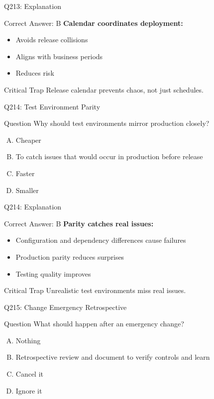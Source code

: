 \documentclass{beamer}
\begin{document}
	\begin{frame}{Q213: Explanation}
		\begin{block}{Correct Answer: B}
			\textbf{Calendar coordinates deployment:}
			\begin{itemize}
				\item Avoids release collisions
				\item Aligns with business periods
				\item Reduces risk
			\end{itemize}
		\end{block}
		\begin{alertblock}{Critical Trap}
			Release calendar prevents chaos, not just schedules.
		\end{alertblock}
	\end{frame}
	
	\begin{frame}{Q214: Test Environment Parity}
		\begin{block}{Question}
			Why should test environments mirror production closely?
		\end{block}
		\begin{enumerate}[(A)]
			\item Cheaper
			\item To catch issues that would occur in production before release
			\item Faster
			\item Smaller
		\end{enumerate}
	\end{frame}
	
	\begin{frame}{Q214: Explanation}
		\begin{block}{Correct Answer: B}
			\textbf{Parity catches real issues:}
			\begin{itemize}
				\item Configuration and dependency differences cause failures
				\item Production parity reduces surprises
				\item Testing quality improves
			\end{itemize}
		\end{block}
		\begin{alertblock}{Critical Trap}
			Unrealistic test environments miss real issues.
		\end{alertblock}
	\end{frame}
	
	\begin{frame}{Q215: Change Emergency Retrospective}
		\begin{block}{Question}
			What should happen after an emergency change?
		\end{block}
		\begin{enumerate}[(A)]
			\item Nothing
			\item Retrospective review and document to verify controls and learn
			\item Cancel it
			\item Ignore it
		\end{enumerate}
	\end{frame}
	
\end{document}

